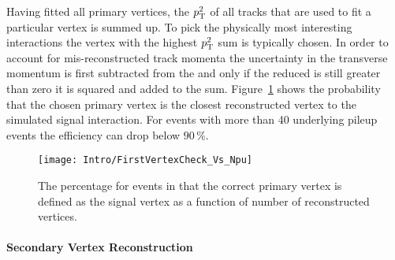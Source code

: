 Having fitted all primary vertices, the $p_{\mathrm{T}}^{2}$ of all tracks that are used to fit a particular vertex is summed up. To pick the physically most interesting interactions the vertex with the highest $p_{\mathrm{T}}^{2}$ sum is typically chosen. In order to account for mis-reconstructed track momenta the uncertainty in the transverse momentum is first subtracted from the \pt and only if the reduced \pt is still greater than zero it is squared and added to the sum. Figure~\ref{plot:IntroSigVertexProb} shows the probability that the chosen primary vertex is the closest reconstructed vertex to the simulated signal interaction. For events with more than 40 underlying pileup events the efficiency can drop below $90\,{}\%{}$.

\begin{figure}[Htb]
    \centering
    \texttt{[image: Intro/FirstVertexCheck\_Vs\_Npu]}
    \caption[Probability to define the correct vertex as signal]{The percentage for events in that the correct primary vertex is defined as the signal vertex as a function of number of reconstructed vertices. \label{plot:IntroSigVertexProb}}
\end{figure}

\paragraph*{Secondary Vertex Reconstruction}

